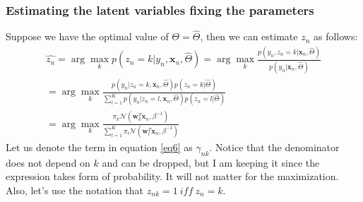 \documentclass[a4paper,11pt]{article}
\begin{document}
\begin{mlsolution}
\subsubsection{Estimating the latent variables fixing the parameters}
Suppose we have the optimal value of $\Theta = \hat{\Theta}$, then we can estimate $z_n$ as follows:
\begin{eqnarray}
\hat{z_n} = \arg \max_{k}p(z_n=k| y_n, \textbf{x}_n, \hat{\Theta}) =  \arg \max_{k} \frac{p(y_n, z_n = k| \textbf{x}_n, \hat{\Theta})}{p(y_n|\textbf{x}_n , \hat{\Theta})} \\ 
 =  \arg \max_{k} \frac{p(y_n| z_n = k, \textbf{x}_n , \hat{\Theta})p(z_n = k| \hat{\Theta})}{\sum_{l=1}^{K}p(y_n| z_n = l, \textbf{x}_n , \hat{\Theta})p(z_n = l| \hat{\Theta})} \\
 =  \arg \max_{k} \frac{\pi_k \mathcal{N}(\textbf{w}^{T}_{k}\textbf{x}_n , \beta^{-1})}{\sum_{l=1}^{K}\pi_l \mathcal{N}(\textbf{w}^{T}_{l}\textbf{x}_n , \beta^{-1})}
 \label{eq6}
\end{eqnarray}
Let us denote the term in equation \ref{eq6} as $\gamma_{nk}$. Notice that the denominator does not depend on $k$ and can be dropped, but I am keeping it since the expression takes form of probability. It will not matter for the maximization. Also, let's use the notation that $z_{nk} = 1 \ \textit{iff} \ z_n = k$.


\end{mlsolution}
\end{document}
